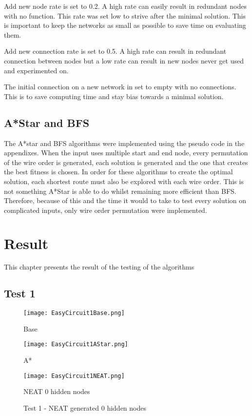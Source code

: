 \documentclass{kththesis}
\begin{document}
Add new node rate is set to 0.2. A high rate can easily result in redundant nodes with no function. This rate was set low to strive after the minimal solution. This is important to keep the networks as small as possible to save time on evaluating them. 

Add new connection rate is set to 0.5. A high rate can result in redundant connection between nodes but a low rate can result in new nodes never get used and experimented on.

The initial connection on a new network in set to empty with no connections. This is to save computing time and stay bias towards a minimal solution.






\section{A*Star and BFS}
The A*star and BFS algorithms were implemented using the pseudo code in the appendixes. When the input uses multiple start and end node, every permutation of the wire order is generated, each solution is generated and the one that creates the best fitness is chosen. In order for these algorithms to create the optimal solution, each shortest route must also be explored with each wire order. This is not something A*Star is able to do whilst remaining more efficient than BFS. Therefore, because of this and the time it would to take to test every solution on complicated inputs, only wire order permutation were implemented.


\chapter{Result}

This chapter presents the result of the testing of the algorithms

\section{Test 1}

\begin{figure}[h]
{\centering

\begin{minipage}{0.3\textwidth}
\centering
\texttt{[image: EasyCircuit1Base.png]}
\caption{Base}
\end{minipage}\hfill
\begin{minipage}{0.3\textwidth}
\centering
\texttt{[image: EasyCircuit1AStar.png]}
\caption{A*}
\end{minipage}\hfill
\begin{minipage}{0.3\textwidth}
\centering
\texttt{[image: EasyCircuit1NEAT.png]}
\caption{NEAT 0 hidden nodes}
\end{minipage}\hfill
\caption{Test 1 - NEAT generated 0 hidden nodes}
\label{Test 1}
}

\end{figure}
\end{document}
